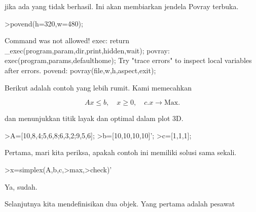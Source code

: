 \documentclass{article}
\begin{document}
\begin{eulernotebook}
\begin{eulercomment}
\begin{eulercomment}
\begin{eulercomment}
jika ada yang tidak berhasil. Ini akan membiarkan jendela Povray
terbuka.
\end{eulercomment}
\begin{eulerprompt}
>povend(h=320,w=480);
\end{eulerprompt}
\begin{euleroutput}
  Command was not allowed!
  exec:
      return _exec(program,param,dir,print,hidden,wait);
  povray:
      exec(program,params,defaulthome);
  Try "trace errors" to inspect local variables after errors.
  povend:
      povray(file,w,h,aspect,exit); 
\end{euleroutput}
\begin{eulercomment}
Berikut adalah contoh yang lebih rumit. Kami memecahkan

\end{eulercomment}
\begin{eulerformula}
\[
Ax \le b, \quad x \ge 0, \quad c.x \to \text{Max.}
\]
\end{eulerformula}
\begin{eulercomment}
dan menunjukkan titik layak dan optimal dalam plot 3D.
\end{eulercomment}
\begin{eulerprompt}
>A=[10,8,4;5,6,8;6,3,2;9,5,6];
>b=[10,10,10,10]';
>c=[1,1,1];
\end{eulerprompt}
\begin{eulercomment}
Pertama, mari kita periksa, apakah contoh ini memiliki solusi sama
sekali.
\end{eulercomment}
\begin{eulerprompt}
>x=simplex(A,b,c,>max,>check)'
\end{eulerprompt}
\begin{euleroutput}
  [0,  1,  0.5]
\end{euleroutput}
\begin{eulercomment}
Ya, sudah.

Selanjutnya kita mendefinisikan dua objek. Yang pertama adalah pesawat


\end{eulercomment}
\end{eulercomment}
\end{eulercomment}
\end{eulernotebook}
\end{document}
